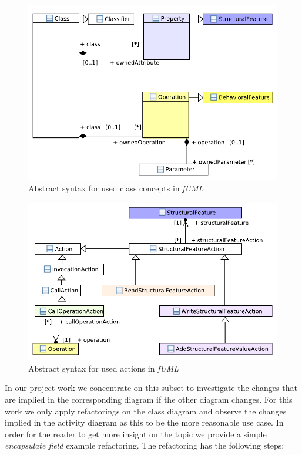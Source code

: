 \documentclass{llncs}
\begin{document}
\begin{figure}[h!t]
 \centering
 \includegraphics[scale=0.9]{images/Model_Model_Classifiers}
 \caption{Abstract syntax for used class concepts in \textit{fUML}}
 \label{fig:fuml1}
\end{figure}

\begin{figure}[h!t]
 \centering
 \includegraphics[scale=0.9]{images/Model_Model_Behavior}
 \caption{Abstract syntax for used actions in \textit{fUML}}
 \label{fig:fuml2}
\end{figure}

In our project work we concentrate on this subset to investigate the changes that are implied in the corresponding
diagram if the other diagram changes. For this work we only apply refactorings on the class diagram and observe the
changes implied in the activity diagram as this to be the more reasonable use case. In order for the reader to get more
insight on the topic we provide a simple \textit{encapsulate field} example refactoring. The refactoring has the
following steps:
\end{document}
